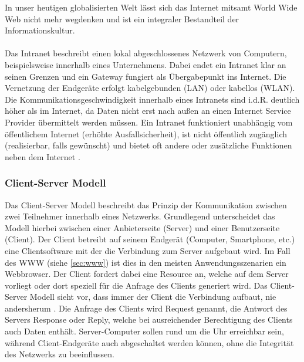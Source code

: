 In unser heutigen globalisierten Welt lässt sich das Internet mitsamt World Wide Web nicht mehr wegdenken und ist ein integraler Bestandteil der Informationskultur. 
 \\ \\
 Das Intranet beschreibt einen lokal abgeschlossenes Netzwerk von Computern, beispielsweise innerhalb eines Unternehmens. Dabei endet ein Intranet klar an seinen Grenzen und ein Gateway fungiert als Übergabepunkt ins Internet. Die Vernetzung der Endgeräte erfolgt kabelgebunden (LAN) oder kabellos (WLAN). Die Kommunikationsgeschwindigkeit innerhalb eines Intranets sind i.d.R. deutlich höher als im Internet, da Daten nicht erst nach außen an einen Internet Service Provider übermittelt werden müssen. Ein Intranet funktioniert unabhängig vom öffentlichem Internet (erhöhte Ausfallsicherheit), ist nicht öffentlich zugänglich (realisierbar, falls gewünscht) und bietet oft andere oder zusätzliche Funktionen neben dem Internet \cite{Intranet62:online}. 
 
 \subsubsection{Client-Server Modell}\label{sec:clientservermodell}
 Das Client-Server Modell beschreibt das Prinzip der Kommunikation zwischen zwei Teilnehmer innerhalb eines Netzwerks. Grundlegend unterscheidet das Modell hierbei zwischen einer Anbieterseite (Server) und einer Benutzerseite (Client). Der Client betreibt auf seinem Endgerät (Computer, Smartphone, etc.) eine Clientsoftware mit der die Verbindung zum Server aufgebaut wird. Im Fall des WWW (siehe \ref{sec:www}) ist dies in den meisten Anwendungsszenarien ein Webbrowser. Der Client fordert dabei eine Resource an, welche auf dem Server vorliegt oder dort speziell für die Anfrage des Clients generiert wird. Das Client-Server Modell sieht vor, dass immer der Client die Verbindung aufbaut, nie andersherum \cite{ElektronikKompendium.de}. Die Anfrage des Clients wird Request genannt, die Antwort des Servers Response oder Reply, welche bei ausreichender Berechtigung des Clients auch Daten enthält. 
 Server-Computer sollen rund um die Uhr erreichbar sein, während Client-Endgeräte auch abgeschaltet werden können, ohne die Integrität des Netzwerks zu beeinflussen. 
 
